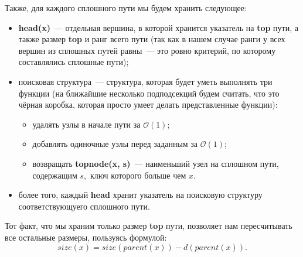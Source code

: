 Также, для каждого сплошного пути мы будем хранить следующее:
\begin{itemize}
    \item \textbf{head(x)}~--- отдельная вершина, в которой хранится указатель на \textbf{top} пути, а также размер \textbf{top} и ранг всего пути (так как в нашем случае ранги у всех вершин из сплошных путей равны~--- это ровно критерий, по которому составлялись сплошные пути);
    \item поисковая структура~--- структура, которая будет уметь выполнять три функции (на ближайшие несколько подподсекций будем считать, что это чёрная коробка, которая просто умеет делать представленные функции):
    \begin{itemize}
        \item удалять узлы в начале пути за $\mathcal{O}(1)$;
        \item добавлять одиночные узлы перед заданным за $\mathcal{O}(1)$;
        \item возвращать \textbf{topnode(x, s)}~--- наименьший узел на сплошном пути, содержащим $s,$ ключ которого больше чем $x.$
    \end{itemize}
    \item более того, каждый \textbf{head} хранит указатель на поисковую структуру соответствующуего сплошного пути.
\end{itemize}

Тот факт, что мы храним только размер \textbf{top} пути, позволяет нам пересчитывать все остальные размеры, пользуясь формулой:
\begin{equation*}
    size(x) = size(parent(x)) - d(parent(x)).
\end{equation*}


